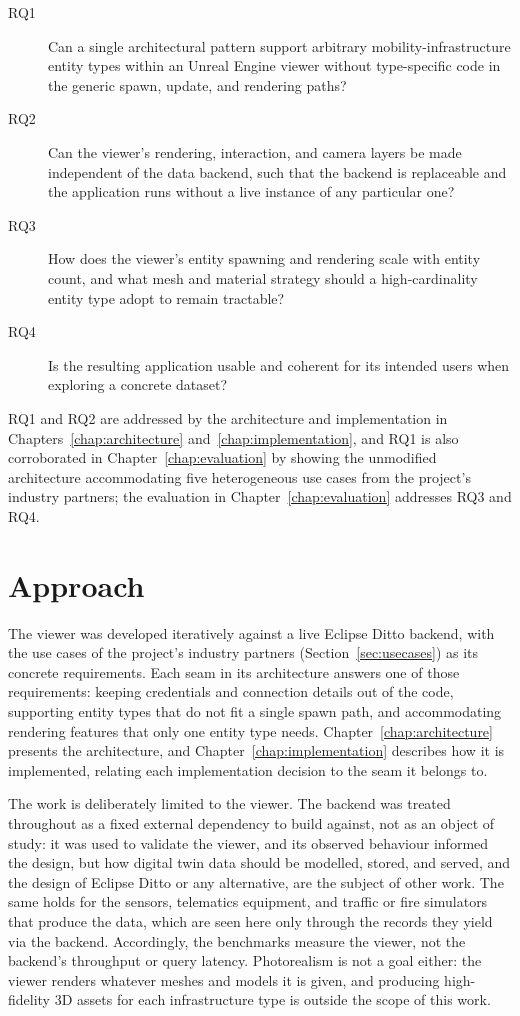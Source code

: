 \begin{description}
  \item[RQ1] Can a single architectural pattern support arbitrary mobility-infrastructure entity types within an Unreal Engine viewer without type-specific code in the generic spawn, update, and rendering paths?
  \item[RQ2] Can the viewer's rendering, interaction, and camera layers be made independent of the data backend, such that the backend is replaceable and the application runs without a live instance of any particular one?
  \item[RQ3] How does the viewer's entity spawning and rendering scale with entity count, and what mesh and material strategy should a high-cardinality entity type adopt to remain tractable?
  \item[RQ4] Is the resulting application usable and coherent for its intended users when exploring a concrete dataset?
\end{description}

RQ1 and RQ2 are addressed by the architecture and implementation in Chapters~\ref{chap:architecture} and~\ref{chap:implementation}, and RQ1 is also corroborated in Chapter~\ref{chap:evaluation} by showing the unmodified architecture accommodating five heterogeneous use cases from the project's industry partners; the evaluation in Chapter~\ref{chap:evaluation} addresses RQ3 and RQ4.

\section{Approach}
\label{sec:approach}

The viewer was developed iteratively against a live Eclipse Ditto backend, with the use cases of the project's industry partners (Section~\ref{sec:usecases}) as its concrete requirements. Each seam in its architecture answers one of those requirements: keeping credentials and connection details out of the code, supporting entity types that do not fit a single spawn path, and accommodating rendering features that only one entity type needs. Chapter~\ref{chap:architecture} presents the architecture, and Chapter~\ref{chap:implementation} describes how it is implemented, relating each implementation decision to the seam it belongs to.

The work is deliberately limited to the viewer\label{sec:scope}. The backend was treated throughout as a fixed external dependency to build against, not as an object of study: it was used to validate the viewer, and its observed behaviour informed the design, but how digital twin data should be modelled, stored, and served, and the design of Eclipse Ditto or any alternative, are the subject of other work. The same holds for the sensors, telematics equipment, and traffic or fire simulators that produce the data, which are seen here only through the records they yield via the backend. Accordingly, the benchmarks measure the viewer, not the backend's throughput or query latency. Photorealism is not a goal either: the viewer renders whatever meshes and models it is given, and producing high-fidelity 3D assets for each infrastructure type is outside the scope of this work.

